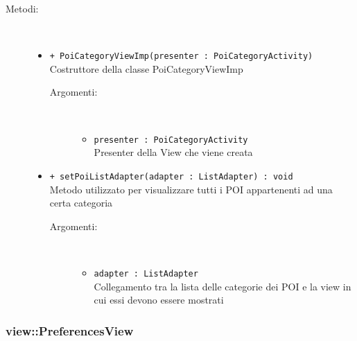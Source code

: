 \documentclass[../DefinizioneDiProdotto.tex]{subfiles}
\begin{document}
\begin{description}
\begin{itemize}
\end{itemize}
\item[Metodi:] \
\begin{itemize}
\item \texttt{+ PoiCategoryViewImp(presenter : PoiCategoryActivity)}\\
Costruttore della classe PoiCategoryViewImp
 \begin{description}
\item[Argomenti:] \
\begin{itemize}
\item \texttt{presenter : PoiCategoryActivity}\\
Presenter della View che viene creata\end{itemize}
\end{description}
\item \texttt{+ setPoiListAdapter(adapter : ListAdapter) : void}\\
Metodo utilizzato per visualizzare tutti i POI appartenenti ad una certa categoria
 \begin{description}
\item[Argomenti:] \
\begin{itemize}
\item \texttt{adapter : ListAdapter}\\
Collegamento tra la lista delle categorie dei POI e la view in cui essi devono essere mostrati\end{itemize}
\end{description}
\end{itemize}
\end{description}

\subsubsection{view::PreferencesView}
\end{document}
